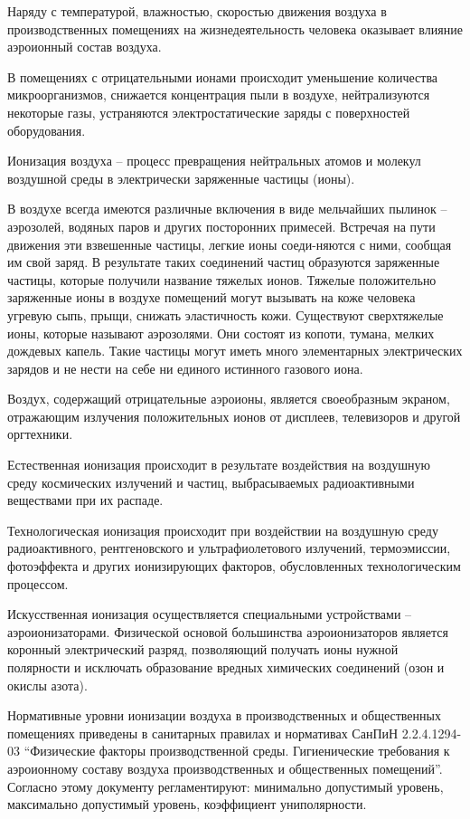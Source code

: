 Наряду с температурой, влажностью, скоростью движения воздуха в производственных помещениях на жизнедеятельность человека оказывает влияние аэроионный состав воздуха.

В помещениях с отрицательными ионами происходит уменьшение количества микроорганизмов, снижается концентрация пыли в воздухе, нейтрализуются некоторые газы, устраняются электростатические заряды с поверхностей оборудования.

Ионизация воздуха – процесс превращения нейтральных атомов и молекул воздушной среды в электрически заряженные частицы (ионы).

В воздухе всегда имеются различные включения в виде мельчайших пылинок – аэрозолей, водяных паров и других посторонних примесей. Встречая на пути движения эти взвешенные частицы, легкие ионы соеди-няются с ними, сообщая им свой заряд. В результате таких соединений частиц образуются заряженные частицы, которые получили название тяжелых ионов. Тяжелые положительно заряженные ионы в воздухе помещений могут вызывать на коже человека угревую сыпь, прыщи, снижать эластичность кожи. Существуют сверхтяжелые ионы, которые называют аэрозолями. Они состоят из копоти, тумана, мелких дождевых капель. Такие частицы могут иметь много элементарных электрических зарядов и не нести на себе ни единого истинного газового иона.

Воздух, содержащий отрицательные аэроионы, является своеобразным экраном, отражающим излучения положительных ионов от дисплеев, телевизоров и другой оргтехники.

Естественная ионизация происходит в результате воздействия на воздушную среду космических излучений и частиц, выбрасываемых радиоактивными веществами при их распаде.

Технологическая ионизация происходит при воздействии на воздушную среду радиоактивного, рентгеновского и ультрафиолетового излучений, термоэмиссии, фотоэффекта и других ионизирующих факторов, обусловленных технологическим процессом.

Искусственная ионизация осуществляется специальными устройствами – аэроионизаторами. Физической основой большинства аэроионизаторов является коронный электрический разряд, позволяющий получать ионы нужной полярности и исключать образование вредных химических соединений (озон и окислы азота).

Нормативные уровни ионизации воздуха в производственных и общественных помещениях приведены в санитарных правилах и нормативах СанПиН 2.2.4.1294-03 “Физические факторы производственной среды. Гигиенические требования к аэроионному составу воздуха производственных и общественных помещений”. Согласно этому документу регламентируют: минимально допустимый уровень, максимально допустимый уровень, коэффициент униполярности.

